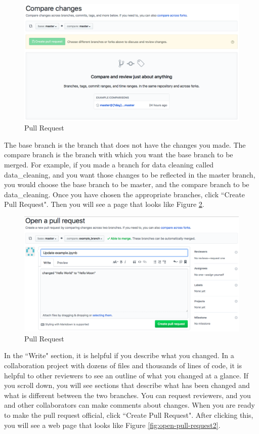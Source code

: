 \documentclass[11pt,a4paper]{article}
\begin{document}
\begin{figure}[h!]
\centering
\includegraphics[width=.7\textwidth]{figures/pull_request2.png}
\caption{Pull Request}
\label{fig:pull-request2}
\end{figure}

The base branch is the branch that does not have the changes you made.
The compare branch is the branch with which you want the base branch to be merged.
For example, if you made a branch for data cleaning called data\_cleaning, and you want those changes to be reflected in the master branch, you would choose the base branch to be master, and the compare branch to be data\_cleaning.
Once you have chosen the appropriate branches, click ``Create Pull Request".
Then you will see a page that looks like Figure \ref{fig:open-pull-request}.

\begin{figure}[h!]
\centering
\includegraphics[width=.7\textwidth]{figures/open_pull_request.png}
\caption{Pull Request}
\label{fig:open-pull-request}
\end{figure}

In the ``Write" section, it is helpful if you describe what you changed.
In a collaboration project with dozens of files and thousands of lines of code, it is helpful to other reviewers to see an outline of what you changed at a glance.
If you scroll down, you will see sections that describe what has been changed and what is different between the two branches.
You can request reviewers, and you and other collaborators can make comments about changes.
When you are ready to make the pull request official, click ``Create Pull Request".
After clicking this, you will see a web page that looks like Figure \ref{fig:open-pull-request2}.
\end{document}
